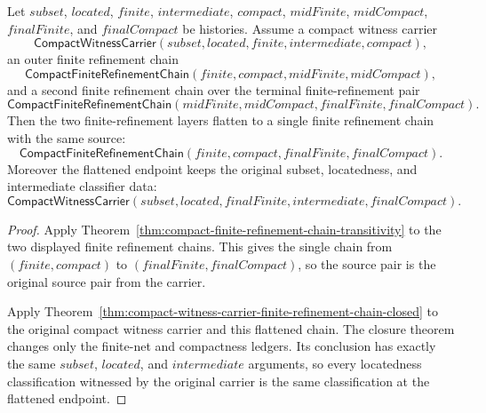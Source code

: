 \begin{theorem}
\label{thm:compact-finite-refinement-flattening}
Let $subset$, $located$, $finite$, $intermediate$, $compact$, $midFinite$,
$midCompact$, $finalFinite$, and $finalCompact$ be histories. Assume a compact
witness carrier
$$
\mathsf{CompactWitnessCarrier}(subset,located,finite,intermediate,compact),
$$
an outer finite refinement chain
$$
\mathsf{CompactFiniteRefinementChain}(finite,compact,midFinite,midCompact),
$$
and a second finite refinement chain over the terminal finite-refinement pair
$$
\mathsf{CompactFiniteRefinementChain}(midFinite,midCompact,finalFinite,finalCompact).
$$
Then the two finite-refinement layers flatten to a single finite refinement
chain with the same source:
$$
\mathsf{CompactFiniteRefinementChain}(finite,compact,finalFinite,finalCompact).
$$
Moreover the flattened endpoint keeps the original subset, locatedness, and
intermediate classifier data:
$$
\mathsf{CompactWitnessCarrier}(subset,located,finalFinite,intermediate,finalCompact).
$$
\end{theorem}
\begin{proof}
Apply Theorem~\autoref{thm:compact-finite-refinement-chain-transitivity} to
the two displayed finite refinement chains. This gives the single chain from
$(finite,compact)$ to $(finalFinite,finalCompact)$, so the source pair is the
original source pair from the carrier.

Apply Theorem~\autoref{thm:compact-witness-carrier-finite-refinement-chain-closed}
to the original compact witness carrier and this flattened chain. The closure
theorem changes only the finite-net and compactness ledgers. Its conclusion has
exactly the same $subset$, $located$, and $intermediate$ arguments, so every
locatedness classification witnessed by the original carrier is the same
classification at the flattened endpoint.
\end{proof}

